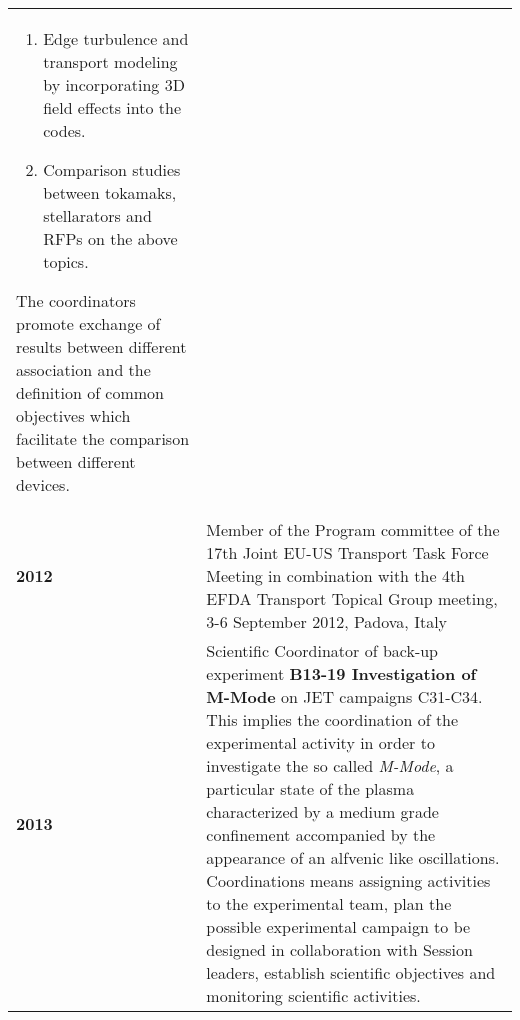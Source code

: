 \begin{longtable}{>{\bfseries}l p{11cm}}
\begin{enumerate}
\item Edge turbulence and transport modeling by incorporating 3D field effects into the codes.
\item Comparison studies between tokamaks, stellarators and RFPs on the above topics.
\end{enumerate}
The coordinators promote exchange of results between different
association and the definition of common objectives which facilitate
the comparison between different devices. \\
2012 & Member of the Program committee of the 17th Joint EU-US Transport Task Force
Meeting in combination with the 4th EFDA Transport Topical Group
meeting, 3-6 September 2012, Padova, Italy \\
2013 & Scientific Coordinator of back-up experiment \textbf{B13-19
  Investigation of M-Mode} on JET
campaigns C31-C34. This implies the coordination of the experimental activity
in order to investigate the so called \emph{M-Mode},  a particular
state of the plasma characterized by a medium grade confinement
accompanied by the appearance of an alfvenic like
oscillations. Coordinations means assigning activities to the
experimental team, plan the possible experimental campaign to be
designed in collaboration with Session leaders,  establish scientific
objectives and monitoring scientific activities.

\end{longtable}

